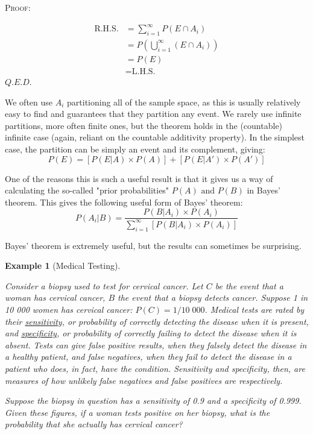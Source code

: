 \documentclass[12pt,a4paper]{article}
\newtheorem{ex}[thm]{Example}
\begin{document}
\textsc{Proof:}\par
\vspace{12pt}
\begin{align*}
\text{R.H.S.} &= \sum_{i=1}^{\infty}P(E \cap A_i)\\
&= P\left(\bigcup_{i=1}^{\infty}(E\cap A_i)\right)\\
&= P(E)\\
&= \text{L.H.S.}
\end{align*}
\hfill $Q.E.D.$


We often use $A_i$ partitioning all of the sample space, as this is usually relatively easy to find and guarantees that they partition any event. We rarely use infinite partitions, more often finite ones, but the theorem holds in the (countable) infinite case (again, reliant on the countable additivity property). In the simplest case, the partition can be simply an event and its complement, giving:
$$P(E) =[ P(E|A) \times P(A)] + [P(E|A') \times P(A')]$$

One of the reasons this is such a useful result is that it gives us a way of calculating the so-called "prior probabilities" $P(A) \text{ and } P(B)$ in Bayes' theorem. This gives the following useful form of Bayes' theorem:
$$P(A_i|B) = \frac{P(B|A_i) \times P(A_i)}{\sum\limits_{i=1}^{\infty}[P(B|A_i) \times P(A_i)]}$$\par
\vspace{12pt}

\noindent Bayes' theorem is extremely useful, but the results can sometimes be surprising.

\begin{ex}[Medical Testing]$\;$\par
\vspace{12pt}

Consider a biopsy used to test for cervical cancer. Let $C$ be the event that a woman has cervical cancer, $B$ the event that a biopsy detects cancer. Suppose 1 in 10 000 women has cervical cancer: $P(C) = 1/10\;000$. Medical tests are rated by their \underline{sensitivity}, or probability of correctly detecting the disease when it is present, and \underline{specificity}, or probability of correctly failing to detect the disease when it is absent. Tests can give false positive results, when they falsely detect the disease in a healthy patient, and false negatives, when they fail to detect the disease in a patient who does, in fact, have the condition. Sensitivity and specificity, then, are measures of how unlikely false negatives and false positives are respectively.

\indent Suppose the biopsy in question has a sensitivity of 0.9 and a specificity of 0.999. Given these figures, if a woman tests positive on her biopsy, what is the probability that she actually has cervical cancer?
\end{ex}
\end{document}
